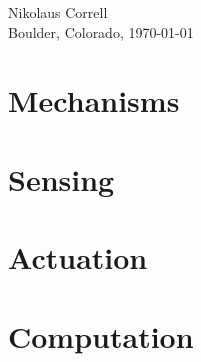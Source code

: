 \documentclass[paper=6.14in:9.21in,pagesize=pdftex,11pt,twoside,openright]{scrbook}
\begin{document}
\begin{flushright}
Nikolaus Correll\\
Boulder, Colorado, \today
\end{flushright}



\part{Mechanisms}





\part{Sensing}



\part{Actuation}

\part{Computation}

















\appendix











\printindex
\end{document}

